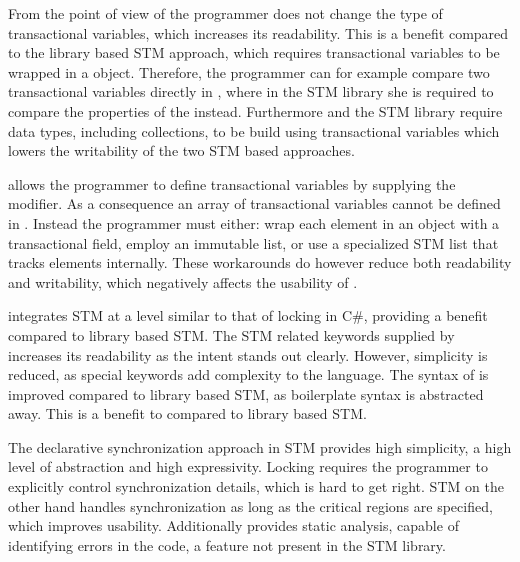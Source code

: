 From the point of view of the programmer \stmname does not change the type of transactional variables, which increases its readability. This is a benefit compared to the library based \ac{STM} approach, which requires transactional variables to be wrapped in a  object. Therefore, the programmer can for example compare two transactional variables directly in \stmname, where in the \ac{STM} library she is required to compare the  properties of the  instead. Furthermore \stmname and the \ac{STM} library require data types, including collections, to be build using transactional variables which lowers the writability of the two \ac{STM} based approaches.  %

\stmname allows the programmer to define transactional variables by supplying the  modifier. As a consequence an array of transactional variables cannot be defined in \stmname. Instead the programmer must either: wrap each element in an object with a transactional field, employ an immutable list, or use a specialized \ac{STM} list that tracks elements internally. These workarounds do however reduce both readability and writability, which negatively affects the usability of \stmname.

\stmname integrates \ac{STM} at a level similar to that of locking in C\#, providing a benefit compared to library based \ac{STM}. The \ac{STM} related keywords supplied by \stmname increases its readability as the intent stands out clearly. However, simplicity is  reduced, as special keywords add complexity to the language. The syntax of \stmname is improved compared to library based \ac{STM}, as boilerplate syntax is abstracted away. This is a benefit to \stmname compared to library based \ac{STM}. 

The declarative synchronization approach in \ac{STM} provides high simplicity, a high level of abstraction and high expressivity. Locking requires the programmer to explicitly control synchronization details, which is hard to get right. \ac{STM} on the other hand handles synchronization as long as the critical regions are specified, which improves usability. Additionally \stmname provides static analysis, capable of identifying errors in the code, a feature not present in the \ac{STM} library. 

